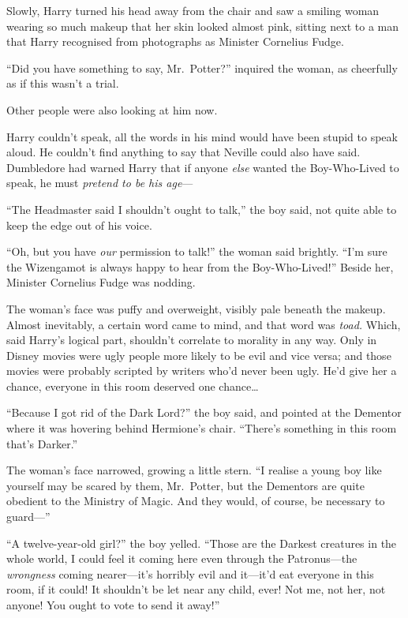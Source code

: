 Slowly, Harry turned his head away from the chair and saw a smiling
woman wearing so much makeup that her skin looked almost pink, sitting
next to a man that Harry recognised from photographs as Minister
Cornelius Fudge.

``Did you have something to say, Mr.~Potter?'' inquired the woman, as
cheerfully as if this wasn't a trial.

Other people were also looking at him now.

Harry couldn't speak, all the words in his mind would have been stupid
to speak aloud. He couldn't find anything to say that Neville could also
have said. Dumbledore had warned Harry that if anyone \emph{else} wanted
the Boy-Who-Lived to speak, he must \emph{pretend to be his age}---

``The Headmaster said I shouldn't ought to talk,'' the boy said, not
quite able to keep the edge out of his voice.

``Oh, but you have \emph{our} permission to talk!'' the woman said
brightly. ``I'm sure the Wizengamot is always happy to hear from the
Boy-Who-Lived!'' Beside her, Minister Cornelius Fudge was nodding.

The woman's face was puffy and overweight, visibly pale beneath the
makeup. Almost inevitably, a certain word came to mind, and that word
was \emph{toad.} Which, said Harry's logical part, shouldn't correlate
to morality in any way. Only in Disney movies were ugly people more
likely to be evil and vice versa; and those movies were probably
scripted by writers who'd never been ugly. He'd give her a chance,
everyone in this room deserved one chance\ldots{}

``Because I got rid of the Dark Lord?'' the boy said, and pointed at the
Dementor where it was hovering behind Hermione's chair. ``There's
something in this room that's Darker.''

The woman's face narrowed, growing a little stern. ``I realise a young
boy like yourself may be scared by them, Mr.~Potter, but the Dementors
are quite obedient to the Ministry of Magic. And they would, of course,
be necessary to guard---''

``A twelve-year-old girl?'' the boy yelled. ``Those are the Darkest
creatures in the whole world, I could feel it coming here even through
the Patronus---the \emph{wrongness} coming nearer---it's horribly evil
and it---it'd eat everyone in this room, if it could! It shouldn't be
let near any child, ever! Not me, not her, not anyone! You ought to vote
to send it away!''

